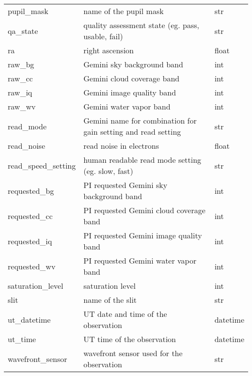 \documentclass[letterpaper,10pt,english]{sphinxmanual}
\begin{document}
\begin{longtable}{|l|l|l|}
pupil\_mask
 & 
name of the pupil mask
 & 
str
\\

qa\_state
 & 
quality assessment state    (eg. pass, usable, fail)
 & 
str
\\

ra
 & 
right ascension
 & 
float
\\

raw\_bg
 & 
Gemini sky background band
 & 
int
\\

raw\_cc
 & 
Gemini cloud coverage band
 & 
int
\\

raw\_iq
 & 
Gemini image quality band
 & 
int
\\

raw\_wv
 & 
Gemini water vapor band
 & 
int
\\

read\_mode
 & 
Gemini name for combination for gain setting and read setting
 & 
str
\\

read\_noise
 & 
read noise in electrons
 & 
float
\\

read\_speed\_setting
 & 
human readable read mode setting (eg. slow, fast)
 & 
str
\\

requested\_bg
 & 
PI requested Gemini sky background band
 & 
int
\\

requested\_cc
 & 
PI requested Gemini cloud coverage band
 & 
int
\\

requested\_iq
 & 
PI requested Gemini image quality band
 & 
int
\\

requested\_wv
 & 
PI requested Gemini water vapor band
 & 
int
\\

saturation\_level
 & 
saturation level
 & 
int
\\

slit
 & 
name of the slit
 & 
str
\\

ut\_datetime
 & 
UT date and time of the observation
 & 
datetime
\\

ut\_time
 & 
UT time of the observation
 & 
datetime
\\

wavefront\_sensor
 & 
wavefront sensor used for the observation
 & 
str
\\


\end{longtable}
\end{document}
